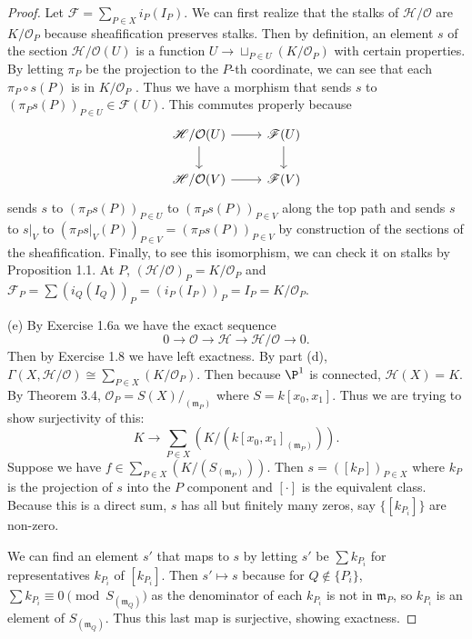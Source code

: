 \begin{proof}
	Let $\mathscr{F} = \sum_{P\in X}i_P(I_P) $.
	We can first realize that the stalks of $\mathscr{H} / \mathcal{O} $ are $K / \mathcal{O}_P$ because sheafification preserves stalks.
	Then by definition, an element $s $ of the section $\mathscr{H} / \mathcal{O} (U)$ is a function $U \to \sqcup_{P\in U} (K / \mathcal{O}_P)$ with certain properties.
	By letting $\pi _P $ be the projection to the $P $-th coordinate, we can see that each $\pi_P\circ s (P)$ is in $K / \mathcal{O}_P $ .
	Thus we have a morphism that sends $s $ to $(\pi_Ps(P))_{P\in U} \in \mathscr{F}(U) $.
	This commutes properly because
	\[
	\begin{tikzcd}
	\mathscr{H} / \mathcal{O}(U) & \mathscr{F}(U)\\
	\mathscr{H} / \mathcal{O}(V) & \mathscr{F}(V)
	\arrow[from=1-1,to=1-2]
	\arrow[from=1-1,to=2-1]
	\arrow[from=2-1,to=2-2]
	\arrow[from=1-2,to=2-2]
	\end{tikzcd}
	\]
	sends $s $ to $(\pi _Ps(P))_{P\in U}$ to $(\pi _Ps(P))_{P \in V} $ along the top path and sends $s $ to $s|_V $ to $(\pi _Ps|_V(P))_{P \in V} = (\pi _Ps(P))_{P\in V} $ by construction of the sections of the sheafification.
	Finally, to see this isomorphism, we can check it on stalks by Proposition 1.1.
	At $P $, $(\mathscr{H} / \mathcal{O})_P = K / \mathcal{O}_P$ and $\mathscr{F}_P = \sum (i_Q(I_Q))_P = (i_P(I_P))_P = I_P = K / \mathcal{O}_P$.

	(e)
	By Exercise 1.6a we have the exact sequence
	\[
		0 \to \mathcal{O} \to \mathscr{H} \to \mathscr{H} / \mathcal{O} \to 0
	.\]
	Then by Exercise 1.8 we have left exactness.
	By part (d), $\Gamma(X,\mathscr{H} / \mathcal{O}) \cong \sum_{P \in X} (K / \mathcal{O}_P)$.
	Then because $\P^1 $ is connected, $\mathscr{H}(X) = K $.
	By Theorem 3.4, $\mathcal{O}_P = S(X) /_{(\mathfrak{m}_P)} $ where $S = k[x_{0},x_{1}] $.
	Thus we are trying to show surjectivity of this:
	\[
		K \to \sum_{P \in X} (K / (k[x_{0},x_{1}]_{(\mathfrak{m}_P)}))
	.\]
	Suppose we have $f \in \sum_{P \in X} (K / (S_{(\mathfrak{m}_P)})) $.
	Then $s = ([k_P])_{P\in X}$ where $k_P $ is the projection of $s $ into the $P $ component and $[\cdot] $ is the equivalent class.
	Because this is a direct sum, $s $ has all but finitely many zeros, say $\{[k_{P_i}]\} $ are non-zero.

	We can find an element $s' $ that maps to $s $ by letting $s' $ be $\sum k_{P_i} $ for representatives $k_{P_i} $ of $[k_{P_i}] $.
	Then $s' \mapsto s $ because for $Q \notin \{P_i\}   $, $\sum k_{P_i} \equiv 0 \pmod{S_{(\mathfrak{m}_Q)}}$ as the denominator of each $k_{P_i} $ is not in $\mathfrak{m}_P $, so $k_{P_i} $ is an element of $S_{(\mathfrak{m}_Q)} $.
	Thus this last map is surjective, showing exactness.
\end{proof}

